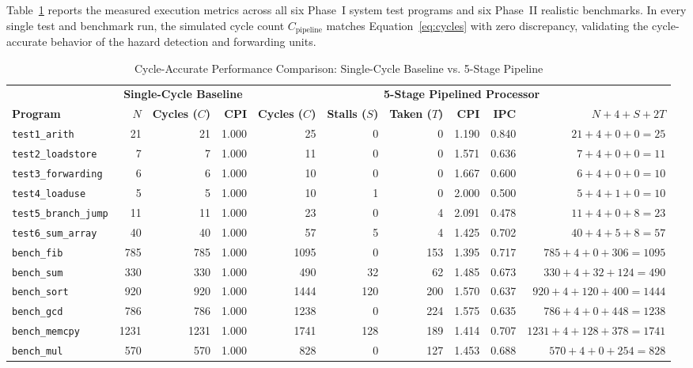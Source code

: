 Table~\ref{tab:perf_summary} reports the measured execution metrics across all six Phase~I
system test programs and six Phase~II realistic benchmarks. In every single test and
benchmark run, the simulated cycle count $C_{\text{pipeline}}$ matches
Equation~\eqref{eq:cycles} with zero discrepancy, validating the cycle-accurate behavior
of the hazard detection and forwarding units.

\begin{table}[!t]
\centering
\caption{Cycle-Accurate Performance Comparison: Single-Cycle Baseline vs. 5-Stage Pipeline}
\label{tab:perf_summary}
\setlength{\tabcolsep}{4.5pt}
\renewcommand{\arraystretch}{1.1}
\begin{tabular}{@{}lrrrrrrrrr@{}}
\toprule
 & \multicolumn{3}{c}{\textbf{Single-Cycle Baseline}} & \multicolumn{6}{c}{\textbf{5-Stage Pipelined Processor}} \\
\cmidrule(lr){2-4} \cmidrule(lr){5-10}
\textbf{Program} & \textbf{$N$} & \textbf{Cycles ($C$)} & \textbf{CPI} & \textbf{Cycles ($C$)} & \textbf{Stalls ($S$)} & \textbf{Taken ($T$)} & \textbf{CPI} & \textbf{IPC} & \textbf{$N+4+S+2T$} \\
\midrule
\texttt{test1\_arith}       & 21   & 21   & 1.000 & 25   & 0   & 0   & 1.190 & 0.840 & $21+4+0+0 = 25$ \\
\texttt{test2\_loadstore}   & 7    & 7    & 1.000 & 11   & 0   & 0   & 1.571 & 0.636 & $7+4+0+0 = 11$ \\
\texttt{test3\_forwarding}  & 6    & 6    & 1.000 & 10   & 0   & 0   & 1.667 & 0.600 & $6+4+0+0 = 10$ \\
\texttt{test4\_loaduse}     & 5    & 5    & 1.000 & 10   & 1   & 0   & 2.000 & 0.500 & $5+4+1+0 = 10$ \\
\texttt{test5\_branch\_jump}& 11   & 11   & 1.000 & 23   & 0   & 4   & 2.091 & 0.478 & $11+4+0+8 = 23$ \\
\texttt{test6\_sum\_array}  & 40   & 40   & 1.000 & 57   & 5   & 4   & 1.425 & 0.702 & $40+4+5+8 = 57$ \\
\midrule
\texttt{bench\_fib}         & 785  & 785  & 1.000 & 1095 & 0   & 153 & 1.395 & 0.717 & $785+4+0+306 = 1095$ \\
\texttt{bench\_sum}         & 330  & 330  & 1.000 & 490  & 32  & 62  & 1.485 & 0.673 & $330+4+32+124 = 490$ \\
\texttt{bench\_sort}        & 920  & 920  & 1.000 & 1444 & 120 & 200 & 1.570 & 0.637 & $920+4+120+400 = 1444$ \\
\texttt{bench\_gcd}         & 786  & 786  & 1.000 & 1238 & 0   & 224 & 1.575 & 0.635 & $786+4+0+448 = 1238$ \\
\texttt{bench\_memcpy}      & 1231 & 1231 & 1.000 & 1741 & 128 & 189 & 1.414 & 0.707 & $1231+4+128+378 = 1741$ \\
\texttt{bench\_mul}         & 570  & 570  & 1.000 & 828  & 0   & 127 & 1.453 & 0.688 & $570+4+0+254 = 828$ \\
\bottomrule
\end{tabular}
\end{table}

